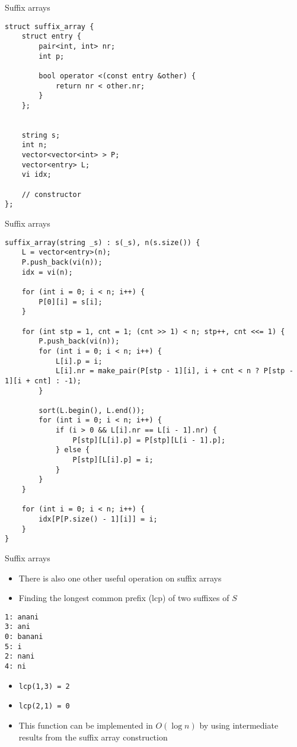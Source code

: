 \documentclass[12pt,t]{beamer}
\newcommand{\bi}{\begin{itemize}}
\newcommand{\ei}{\end{itemize}}
\begin{document}
\begin{frame}[fragile]{Suffix arrays}
    \begin{verbatim}
struct suffix_array {
    struct entry {
        pair<int, int> nr;
        int p;

        bool operator <(const entry &other) {
            return nr < other.nr;
        }
    };


    string s;
    int n;
    vector<vector<int> > P;
    vector<entry> L;
    vi idx;

    // constructor
};
\end{verbatim}
\end{frame}

\begin{frame}[fragile]{Suffix arrays}
    \begin{verbatim}
suffix_array(string _s) : s(_s), n(s.size()) {
    L = vector<entry>(n);
    P.push_back(vi(n));
    idx = vi(n);

    for (int i = 0; i < n; i++) {
        P[0][i] = s[i];
    }

    for (int stp = 1, cnt = 1; (cnt >> 1) < n; stp++, cnt <<= 1) {
        P.push_back(vi(n));
        for (int i = 0; i < n; i++) {
            L[i].p = i;
            L[i].nr = make_pair(P[stp - 1][i], i + cnt < n ? P[stp - 1][i + cnt] : -1);
        }

        sort(L.begin(), L.end());
        for (int i = 0; i < n; i++) {
            if (i > 0 && L[i].nr == L[i - 1].nr) {
                P[stp][L[i].p] = P[stp][L[i - 1].p];
            } else {
                P[stp][L[i].p] = i;
            }
        }
    }

    for (int i = 0; i < n; i++) {
        idx[P[P.size() - 1][i]] = i;
    }
}
\end{verbatim}
\end{frame}

\begin{frame}[fragile]{Suffix arrays}
    \bi
        \item There is also one other useful operation on suffix arrays
        \item Finding the longest common prefix (lcp) of two suffixes of $S$
    \ei

    \begin{verbatim}
1: anani
3: ani
0: banani
5: i
2: nani
4: ni
    \end{verbatim}

    \bi
\item \texttt{lcp(1,3) = 2}
\item \texttt{lcp(2,1) = 0}
    \vspace{10pt}
\item This function can be implemented in $O(\log n)$ by using intermediate results from the suffix array construction
    \ei
\end{frame}
\end{document}

